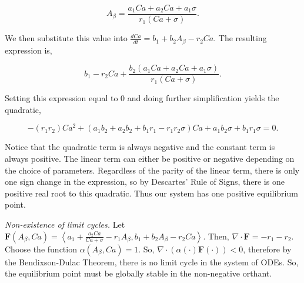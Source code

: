 \documentclass[12pt]{article}
\theoremstyle{definition}
\begin{document}
\[A_{\beta} = \frac{a_1 Ca + a_2 Ca + a_1 \sigma}{r_1 (Ca + \sigma)}.\]

We then substitute this value into $\frac{d Ca}{dt} = b_1 + b_2 A_{\beta} - r_2 Ca$. The resulting expression is,

\[b_1 - r_2 Ca + \frac{b_2 (a_1 Ca + a_2 Ca + a_1 \sigma)}{r_1 (Ca + \sigma)}.\]

Setting this expression equal to 0 and doing further simplification yields the quadratic,

\[-(r_1 r_2)Ca^2 + (a_1 b_2 + a_2 b_2 + b_1 r_1 - r_1 r_2 \sigma)Ca + a_1 b_2 \sigma + b_1 r_1 \sigma = 0.\]

Notice that the quadratic term is always negative and the constant term is always positive. The linear term can either be positive or negative depending on the choice of parameters. Regardless of the parity of the linear term, there is only one sign change in the expression, so by Descartes' Rule of Signs, there is one positive real root to this quadratic. Thus our system has one positive equilibrium point. \bigskip

\textit{Non-existence of limit cycles.} Let $\mathbf{F} (A_{\beta}, Ca) = \left\langle a_1 + \frac{a_2 Ca}{Ca + \sigma} - r_1 A_{\beta}, b_1 + b_2 A_{\beta} - r_2 Ca \right\rangle$. Then, $\nabla \cdot \mathbf{F} = -r_1 - r_2$. Choose the function $\alpha (A_{\beta}, Ca) = 1$. So, $\nabla \cdot (\alpha (\cdot) \mathbf{F} (\cdot)) < 0$, therefore by the Bendixson-Dulac Theorem, there is no limit cycle in the system of ODEs. So, the equilibrium point must be globally stable in the non-negative orthant.
\end{document}
